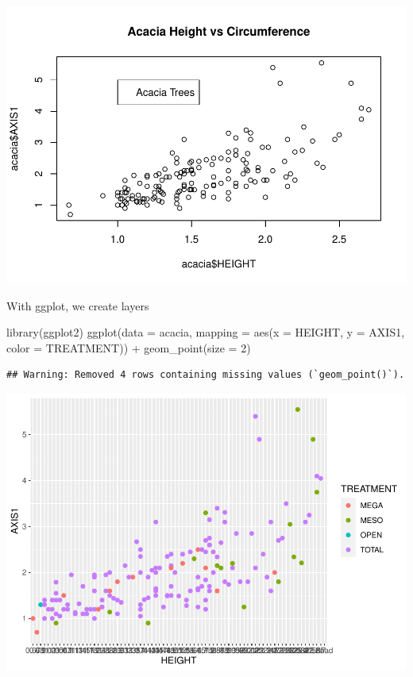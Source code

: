 \documentclass[
]{article}
\newenvironment{Shaded}{\begin{snugshade}}{\end{snugshade}}
\newcommand{\AttributeTok}[1]{\textcolor[rgb]{0.77,0.63,0.00}{#1}}
\newcommand{\DecValTok}[1]{\textcolor[rgb]{0.00,0.00,0.81}{#1}}
\newcommand{\FunctionTok}[1]{\textcolor[rgb]{0.00,0.00,0.00}{#1}}
\newcommand{\NormalTok}[1]{#1}
\newcommand{\SpecialCharTok}[1]{\textcolor[rgb]{0.00,0.00,0.00}{#1}}
\begin{document}
\includegraphics{visualization-uhuru_files/figure-latex/unnamed-chunk-10-1.pdf}

With ggplot, we create layers

\begin{Shaded}
\begin{Highlighting}[]
\FunctionTok{library}\NormalTok{(ggplot2)}
\FunctionTok{ggplot}\NormalTok{(}\AttributeTok{data =}\NormalTok{ acacia, }\AttributeTok{mapping =} \FunctionTok{aes}\NormalTok{(}\AttributeTok{x =}\NormalTok{ HEIGHT, }\AttributeTok{y =}\NormalTok{ AXIS1, }\AttributeTok{color =}\NormalTok{ TREATMENT)) }\SpecialCharTok{+}
\FunctionTok{geom\_point}\NormalTok{(}\AttributeTok{size =} \DecValTok{2}\NormalTok{)}
\end{Highlighting}
\end{Shaded}

\begin{verbatim}
## Warning: Removed 4 rows containing missing values (`geom_point()`).
\end{verbatim}

\includegraphics{visualization-uhuru_files/figure-latex/unnamed-chunk-11-1.pdf}
\end{document}
